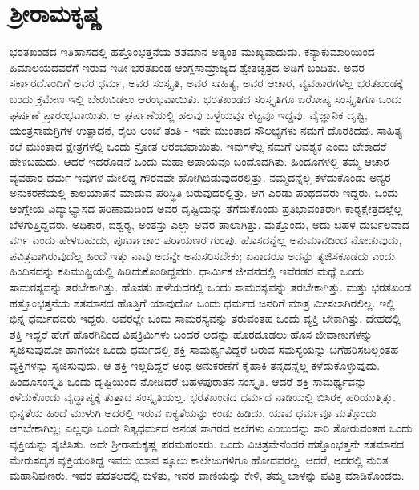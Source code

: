 
\chapter{ಶ‍್ರೀರಾಮಕೃಷ್ಣ}

ಭರತಖಂಡದ ಇತಿಹಾಸದಲ್ಲಿ ಹತ್ತೊಂಭತ್ತನೆಯ ಶತಮಾನ ಅತ್ಯಂತ ಮುಖ್ಯವಾದುದು. ಕನ್ಯಾಕುಮಾರಿಯಿಂದ ಹಿಮಾಲಯದವರೆಗೆ ಇರುವ ಇಡೀ ಭರತಖಂಡ ಆಂಗ್ಲ\break ಸಾಮ್ರಾಜ್ಯದ ಶ್ವೇತಚ್ಛತ್ರದ ಅಡಿಗೆ ಬಂದಿತು. ಅವರ ಸರ್ಕಾರದೊಂದಿಗೆ ಅವರ ಧರ್ಮ, ಅವರ ಸಂಸ್ಕೃತಿ, ಅವರ ಸಾಹಿತ್ಯ, ಅವರ ಆಚಾರ, ವ್ಯವಹಾರಗಳೆಲ್ಲ ಭರತಖಂಡಕ್ಕೆ ಬಂದು ಕ್ರಮೇಣ ಇಲ್ಲಿ ಬೇರುಬಿಡಲು ಆರಂಭವಾಯಿತು. ಭರತಖಂಡದ ಸಂಸ್ಕೃತಿಗೂ ಐರೋಪ್ಯ ಸಂಸ್ಕೃತಿಗೂ ಒಂದು ಘರ್ಷಣೆ ಪ್ರಾರಂಭವಾಯಿತು. ಆ ಘರ್ಷಣೆಯಲ್ಲಿ ಹಲವು ಒಳ್ಳೆಯವೂ ಕೆಟ್ಟವೂ ಇದ್ದವು. ವೈಜ್ಞಾನಿಕ ದೃಷ್ಟಿ, ಯಂತ್ರಸಾಮಗ್ರಿಗಳ ಉತ್ಪಾದನೆ, ರೈಲು ಅಂಚೆ ತಂತಿ - ಇವೇ ಮುಂತಾದ ಸೌಲಭ್ಯಗಳು ನಮಗೆ ದೊರಕಿದವು. ಸಾಹಿತ್ಯ ಕಲೆ ಮುಂತಾದ ಕ್ಷೇತ್ರಗಳಲ್ಲಿ ಒಂದು ಸ್ರೋತ ಆರಂಭವಾಯಿತು. ಇವುಗಳೆಲ್ಲ ನಮಗೆ ಆವಶ್ಯಕ ಎಂದು ಬೇಕಾದರೆ ಹೇಳಬಹುದು. ಆದರೆ ಇದರೊಡನೆ ಒಂದು ಮಹಾ ಅಪಾಯವೂ ಬಂದೊದಗಿತು. ಹಿಂದೂಗಳಲ್ಲಿ ತಮ್ಮ ಆಚಾರ ವ್ಯವಹಾರ ಧರ್ಮ ಇವುಗಳ ಮೇಲಿದ್ದ ಗೌರವವೇ ಹೋಗಿಬಿಡುವುದರಲ್ಲಿತ್ತು. ನಮ್ಮದನ್ನೆಲ್ಲ ಕಳೆದುಕೊಂಡು ಅನ್ಯರ ಅನುಕರಣೆಯಲ್ಲಿ ಕಾಲಯಾಪನೆ ಮಾಡುವ ಪರಿಸ್ಥಿತಿ ಬರುವುದರಲ್ಲಿತ್ತು. ಆಗ ಎರಡು ಪಂಥದವರು ಇದ್ದರು. ಒಂದು ಆಂಗ್ಲೇಯ ವಿದ್ಯಾಭ್ಯಾಸದ ಪರಿಣಾಮದಿಂದ ಅವರ ದೃಷ್ಟಿಯನ್ನು ತೆಗೆದುಕೊಂಡು ಪ್ರತಿಭಾವಂತರಾಗಿ ಕಾರ‍್ಯಕ್ಷೇತ್ರದಲ್ಲೆಲ್ಲ ಬೆಳಗುತ್ತಿದ್ದವರು. ಅಧಿಕಾರ, ಐಶ್ವರ‍್ಯ, ಅಂತಸ್ತು ಎಲ್ಲಾ ಅವರ ಪಾಲಾಗಿತ್ತು. ಮತ್ತೊಂದು, ಅದು ಬಹಳ ದುರ್ಬಲವಾದ ವರ್ಗ ಎಂದು ಹೇಳಬಹುದು, ಪೂರ್ವಾಚಾರ ಪರಾಯಣರ ಗುಂಪು. ಹೊಸದನ್ನೆಲ್ಲ ಅನುಮಾನದಿಂದ ನೋಡುವುದು, ಪವಿತ್ರವಾಗಿರುವುದೆಲ್ಲ ಹಿಂದೆ ಇತ್ತು ನಾವು ಅದನ್ನೇ ಅನುಸರಿಸಬೇಕು; ಏನಾದರೂ ಅದನ್ನು ತ್ಯಜಿಸಕೂಡದು ಎಂದು ಹಿಂದಿನದನ್ನು ಕಪಿಮುಷ್ಟಿಯಲ್ಲಿ ಹಿಡಿದುಕೊಂಡಿದ್ದವರು. ಧಾರ್ಮಿಕ ಜೀವನದಲ್ಲಿ ಇವೆರಡರ ಮಧ್ಯೆ ಒಂದು ಸಾಮರಸ್ಯವನ್ನು ತರಬೇಕಾಗಿತ್ತು. ಹೊಸತು ಹಳೆಯದರಲ್ಲಿ ಒಂದು ಸಾಮರಸ್ಯವನ್ನು ತರಬೇಕಾಗಿತ್ತು. ಮತ್ತು ಭರತಖಂಡ ಹತ್ತೊಂಭತ್ತನೆಯ ಶತಮಾನದ ಹೊತ್ತಿಗೆ ಯಾವುದೋ ಒಂದು ಧರ್ಮದ ಜನರಿಗೆ ಮಾತ್ರ ಮೀಸಲಾಗಿರಲಿಲ್ಲ. ಇಲ್ಲಿ ಭಿನ್ನ ಧರ್ಮದವರು ಇದ್ದರು. ಅವರಲ್ಲೇ ಒಂದು ಸಾಮರಸ್ಯವನ್ನು ತರುವಂತಹ ಒಂದು ವ್ಯಕ್ತಿ ಬೇಕಾಗಿತ್ತು. ದೇಹದಲ್ಲಿ ಶಕ್ತಿ ಇದ್ದರೆ ಹೇಗೆ ಹೊರಗಿನಿಂದ ವಿಷಕ್ರಿಮಿಗಳು ಬಂದರೆ ಅದನ್ನು ಹೊರದೂಡಲು ಹೊಸ ಜೀವಾಣುಗಳನ್ನು ಸೃಜಿಸುವುದೋ ಹಾಗೆಯೇ ಒಂದು ಧರ್ಮದಲ್ಲಿ ಶಕ್ತಿ ಸಾಮರ್ಥ್ಯವಿದ್ದರೆ ಬರುವ ಸಮಸ್ಯೆಯನ್ನು ಬಗೆಹರಿಸಬಲ್ಲಂತಹ ವ್ಯಕ್ತಿಗಳನ್ನು ಸೃಜಿಸುವುದು. ಆ ಶಕ್ತಿ ಇಲ್ಲದಿದ್ದರೆ ಅಂಧ ಅನುಕರಣೆಗೆ ಕೈಹಾಕಿ ತನ್ನದನ್ನೆಲ್ಲ ಕಳೆದುಕೊಳ್ಳುವುದು. ಹಿಂದೂಸಂಸ್ಕೃತಿ ಒಂದು ದೃಷ್ಟಿಯಿಂದ ನೋಡಿದರೆ ಬಹಳ\break ಪುರಾತನ ಸಂಸ್ಕೃತಿ. ಆದರೆ ಶಕ್ತಿ ಸಾಮರ್ಥ್ಯವನ್ನು ಕಳೆದುಕೊಂಡು ವೃದ್ಧಾಪ್ಯಕ್ಕೆ ತುತ್ತಾದ ಸಂಸ್ಕೃತಿಯಲ್ಲ. ಭರತಖಂಡದ ಧರ್ಮದ ನಾಡಿಯಲ್ಲಿ ಬಿಸಿರಕ್ತ ಹರಿಯುತ್ತಿತ್ತು. ಭಿನ್ನತೆಯ ಹಿಂದೆ ಮುಳುಗಿ ಅದರಲ್ಲಿ ಇರುವ ಐಕ್ಯತೆಯನ್ನು ಕಂಡು ಹಿಡಿದು, ಯಾವ ಧರ್ಮವೂ ಮತ್ತೊಂದು ಆಗಬೇಕಾಗಿಲ್ಲ; ಎಲ್ಲವೂ ಒಂದೇ ನಿತ್ಯಧರ್ಮದ ಅನಂತ ಸಾಗರದ ಅಲೆಗಳು ಎಂಬುದನ್ನು ಸಾರಿ ತೋರುವಂತಹ ಒಂದು ವ್ಯಕ್ತಿಯನ್ನು ಸೃಜಿಸಿತು. ಅದೇ ಶ‍್ರೀರಾಮಕೃಷ್ಣ ಪರಮಹಂಸರು. ಒಂದು ವಿಚಿತ್ರವೇನೆಂದರೆ ಹತ್ತೊಂಭತ್ತನೇ ಶತಮಾನದ ಮೇರುಸದೃಶ ವ್ಯಕ್ತಿಯಂತಿದ್ದ ಇವರು ಯಾವ ಸ್ಕೂಲು ಕಾಲೇಜುಗಳಿಗೂ ಹೋದವರಲ್ಲ. ಆದರೆ, ಅದರಲ್ಲಿ ನುರಿತ ಮಹಾನಿಪುಣರು. ಇವರ ಪದತಲದಲ್ಲಿ ಕುಳಿತು, ಇವರ ವಾಣಿಯನ್ನು ಕೇಳಿ, ತಮ್ಮ ಬಾಳನ್ನು ಪವಿತ್ರ ಮಾಡಿಕೊಂಡರು.

